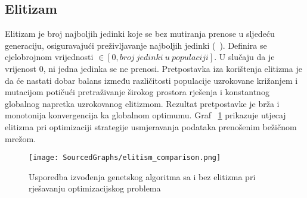 \subsection{Elitizam}
Elitizam je broj najboljih jedinki koje se bez mutiranja prenose u sljedeću generaciju, osiguravajući preživljavanje najboljih jedinki (~\cite{elitism}).
Definira se cjelobrojnom vrijednosti $\in [0, broj\ jedinki\ u\ populaciji]$.
U slučaju da je vrijenost 0, ni jedna jedinka se ne prenosi.
Pretpostavka iza korištenja elitizma je da će nastati dobar balans između različitosti populacije uzrokovane križanjem i mutacijom potičući pretraživanje širokog prostora rješenja i konstantnog globalnog napretka uzrokovanog elitizmom.
Rezultat pretpostavke je brža i monotonija konvergencija ka globalnom optimumu.
Graf ~\ref{fig:elitism} prikazuje utjecaj elitizma pri optimizaciji strategije usmjeravanja podataka prenošenim bežičnom mrežom.

\begin{figure}
	\centering
	\texttt{[image: SourcedGraphs/elitism\_comparison.png]}
	\caption{Usporedba izvođenja genetskog algoritma sa i bez elitizma pri rješavanju optimizacijskog problema}
	\label{fig:elitism}
\end{figure}


